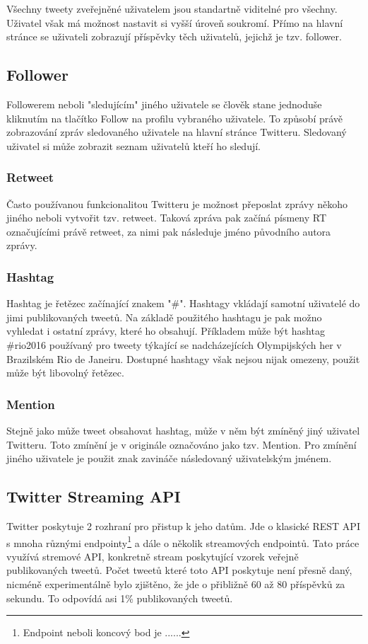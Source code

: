 \documentclass[thesis=B,czech]{FITthesis}[2012/06/26]
\begin{document}
Všechny tweety zveřejněné uživatelem jsou standartně viditelné pro všechny. Uživatel však má možnost nastavit si vyšší úroveň soukromí. Přímo na hlavní stránce se uživateli zobrazují příspěvky těch uživatelů, jejichž je tzv. follower. 

\subsection{Follower}

	Followerem neboli "sledujícím" jiného uživatele se člověk stane jednoduše kliknutím na tlačítko Follow na profilu vybraného uživatele. To způsobí právě zobrazování zpráv sledovaného uživatele na hlavní stránce Twitteru. Sledovaný uživatel si může zobrazit seznam uživatelů kteří ho sledují. 


\subsubsection{Retweet}

	Často používanou funkcionalitou Twitteru je možnost přeposlat zprávy někoho jiného neboli vytvořit tzv. retweet. Taková zpráva pak začíná písmeny RT označujícími právě retweet, za nimi pak následuje jméno původního autora zprávy. 


\subsubsection{Hashtag}

	Hashtag je řetězec začínající znakem "\#". Hashtagy vkládají samotní uživatelé do jimi publikovaných tweetů. Na základě použitého hashtagu je pak možno vyhledat i ostatní zprávy, které ho obsahují. Příkladem může být hashtag \#rio2016 používaný pro tweety týkající se nadcházejících Olympijských her v Brazilském Rio de Janeiru. Dostupné hashtagy však nejsou nijak omezeny, použit může být libovolný řetězec. 


\subsubsection{Mention}

	Stejně jako může tweet obsahovat hashtag, může v něm být zmíněný jiný uživatel Twitteru. Toto zmínění je v originále označováno jako tzv. Mention. Pro zmínění jiného uživatele je použit znak zavináče následovaný uživatelským jménem. 


\subsection{Twitter Streaming API}
	Twitter poskytuje 2 rozhraní pro přistup k jeho datům. Jde o klasické REST API s mnoha různými endpointy\footnote{Endpoint neboli koncový bod je ......} a dále o několik streamových endpointů. Tato práce využívá stremové API, konkretně stream poskytující vzorek veřejně publikovaných tweetů\cite{twitter-api}. Počet tweetů které toto API poskytuje není přesně daný, nicméně experimentálně bylo zjištěno, že jde o přibližně 60 až 80 příspěvků za sekundu. To odpovídá asi 1\% publikovaných tweetů. 
	
\end{document}
